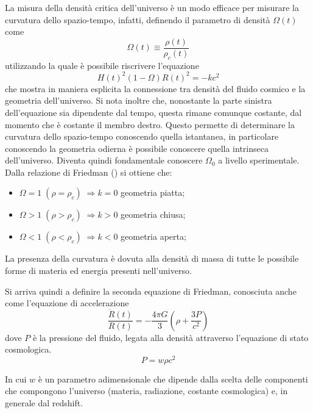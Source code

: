 La misura della densità critica dell'universo è un modo efficace per misurare la curvatura dello spazio-tempo, infatti, definendo il parametro di densità $\Omega(t)$ come
\begin{equation}\label{eq:parametro-densità}
    \Omega (t) \equiv  \frac{\rho (t)}{\rho_c (t)}
\end{equation}
utilizzando la quale è possibile riscrivere l'equazione~
\begin{equation}\label{eq:friedman-omega}
    {H(t)}^2 (1-\Omega){R(t)}^2 = -kc^2
\end{equation}
che mostra in maniera esplicita la connessione tra densità del fluido cosmico e la geometria dell'universo. Si nota inoltre che, nonostante la parte sinistra dell'equazione sia dipendente dal tempo, questa rimane comunque costante, dal momento che è costante il membro destro. Questo permette di determinare la curvatura dello spazio-tempo conoscendo quella istantanea, in particolare conoscendo la geometria odierna è possibile conoscere quella intrinseca dell'universo. Diventa quindi fondamentale conoscere $\Omega_0$ a livello sperimentale.
Dalla relazione di Friedman () si ottiene che:
\begin{itemize}
    \item $\Omega = 1 \; (\rho = \rho_c)\; \Rightarrow k = 0$ geometria piatta;
    \item $\Omega > 1 \; (\rho > \rho_c)\; \Rightarrow k > 0$ geometria chiusa;
    \item $\Omega < 1 \; (\rho < \rho_c)\; \Rightarrow k < 0$ geometria aperta;
\end{itemize}
La presenza della curvatura è dovuta alla densità di massa di tutte le possibile forme di materia ed energia presenti nell'universo.

Si arriva quindi a definire la seconda equazione di Friedman, conosciuta anche come l'equazione di accelerazione
\begin{equation}\label{eq:second-friedman}
    \frac{\ddot{R}(t)}{R(t)} = - \frac{4\pi G}{3} \left( {\rho + \frac{3P}{c^2}} \right)
\end{equation}
dove $P$ è la pressione del fluido, legata alla densità attraverso l'equazione di stato cosmologica.
\begin{equation}\label{eq:equazione-stato-cosmologica}
    P = w \rho c^2
\end{equation}

In cui $w$ è un parametro adimensionale che dipende dalla scelta delle componenti che compongono l'universo (materia, radiazione, costante cosmologica) e, in generale dal redshift.